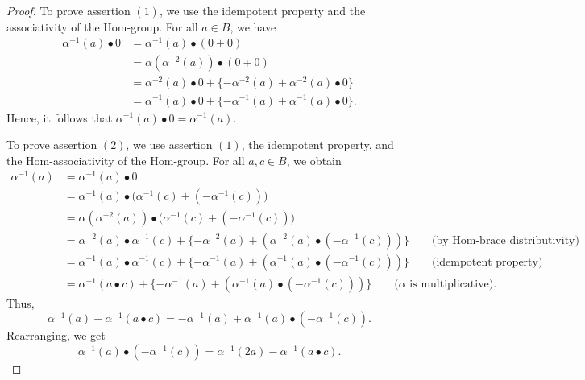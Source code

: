 \documentclass[14pt]{article}
\theoremstyle{Definition}
\theoremstyle{remark}
\begin{document}
\begin{proof}
To prove assertion $(1)$, we use the idempotent property and the associativity of the Hom-group. For all $a \in B$, we have
\begin{align*}
\alpha^{-1}(a)\bullet 0 
   &= \alpha^{-1}(a)\bullet (0+0) \\
   &= \alpha(\alpha^{-2}(a))\bullet (0+0) \\
   &= \alpha^{-2}(a)\bullet 0 + \{-\alpha^{-2}(a) + \alpha^{-2}(a)\bullet 0\} \\
   &= \alpha^{-1}(a)\bullet 0 + \{-\alpha^{-1}(a) + \alpha^{-1}(a)\bullet 0\}.
\end{align*}
Hence, it follows that $\alpha^{-1}(a)\bullet 0 = \alpha^{-1}(a)$.

\smallskip

To prove assertion $(2)$, we use assertion $(1)$, the idempotent property, and the Hom-associativity of the Hom-group. For all $a,c \in B$, we obtain
\begin{align*}
\alpha^{-1}(a) 
   &= \alpha^{-1}(a)\bullet 0 \\
   &= \alpha^{-1}(a)\bullet\bigl(\alpha^{-1}(c)+(-\alpha^{-1}(c))\bigr) \\
   &= \alpha(\alpha^{-2}(a))\bullet\bigl(\alpha^{-1}(c)+(-\alpha^{-1}(c))\bigr) \\
   &= \alpha^{-2}(a)\bullet \alpha^{-1}(c) + \{-\alpha^{-2}(a) + (\alpha^{-2}(a)\bullet(-\alpha^{-1}(c)))\} 
      \qquad \text{(by Hom-brace distributivity)} \\
   &= \alpha^{-1}(a)\bullet \alpha^{-1}(c) + \{-\alpha^{-1}(a) + (\alpha^{-1}(a)\bullet(-\alpha^{-1}(c)))\} 
      \qquad \text{(idempotent property)} \\
   &= \alpha^{-1}(a\bullet c) + \{-\alpha^{-1}(a) + (\alpha^{-1}(a)\bullet(-\alpha^{-1}(c)))\} 
      \qquad \text{($\alpha$ is multiplicative)}.
\end{align*}
Thus,
\[
\alpha^{-1}(a)-\alpha^{-1}(a\bullet c) = -\alpha^{-1}(a) + \alpha^{-1}(a)\bullet(-\alpha^{-1}(c)).
\]
Rearranging, we get
\[
\alpha^{-1}(a)\bullet(-\alpha^{-1}(c)) = \alpha^{-1}(2a) - \alpha^{-1}(a\bullet c).
\]

\smallskip


\end{proof}
\end{document}
